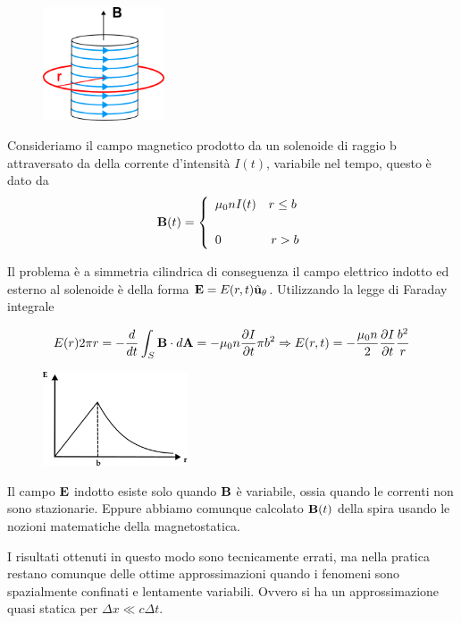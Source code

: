 \begin{figure}  %
    \centering
    \includegraphics[width=0.32\textwidth]{images/solenoid1} %
\end{figure}
Consideriamo il campo magnetico prodotto da un solenoide di raggio b attraversato da della corrente d'intensit\`a $I(t)$, variabile nel tempo,  questo \`e dato da 
\begin{equation*}
	\bold{B}(t) = \left \{\begin{array}{l}
		\mu_0 n I(t) \quad r \leq b \\ \rule{0pt}{25pt}
		0 \quad \quad \quad \quad r > b
	\end{array}\right.
\end{equation*}


Il problema \`e a simmetria cilindrica di conseguenza il campo elettrico  indotto ed esterno al solenoide \`e della forma $\bold{E} = E(r,t) \hat{\bold{u}}_{\theta}$. Utilizzando la legge di Faraday integrale

\begin{equation*}
	E(r) 2 \pi r = - \frac{d}{dt} \int_{S} \bold{B} \cdot d\bold{A} = - \mu_0 n \frac{\partial I}{\partial t} \pi b^2 \Rightarrow E(r,t) = - \frac{\mu_0 n }{2} \frac{\partial I}{\partial t} \frac{b^2}{r}
\end{equation*}
\begin{figure}  %
    \centering
    \includegraphics[width=0.38\textwidth]{images/electric_field} %
\end{figure}
\begin{remark}
	Il campo $\bold{E}$ indotto esiste solo quando $\bold{B}$ \`e variabile, ossia quando le correnti non sono stazionarie. Eppure abbiamo comunque calcolato $\bold{B}(t)$ della spira usando le nozioni matematiche della magnetostatica. 
	
	I risultati ottenuti in questo modo sono tecnicamente errati, ma nella pratica restano comunque delle ottime approssimazioni quando i fenomeni sono spazialmente confinati e lentamente variabili. Ovvero si ha un approssimazione quasi statica per $\Delta x \ll c \Delta t$.
\end{remark}

